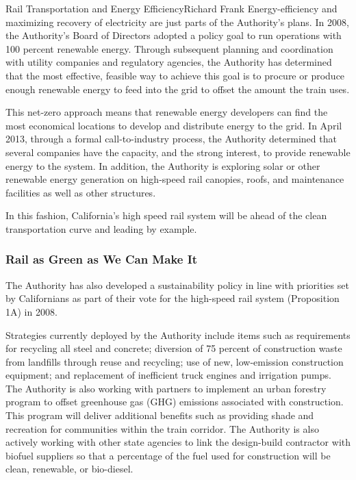 \documentclass{papertex}
\begin{document}
\begin{news}{2}{Rail Transportation and Energy Efficiency}{Richard Frank}{}{}
Energy-efficiency and maximizing recovery of electricity are just parts of the 
Authority’s plans.  In 2008, the Authority’s Board of Directors adopted a 
policy goal to run operations with  100 percent renewable energy. Through 
subsequent planning and coordination with utility companies and regulatory 
agencies, the Authority has determined that the most effective, feasible way 
to achieve this goal is to procure or produce enough renewable energy to feed 
into the grid to offset the amount the train uses.

This net-zero approach means that renewable energy developers can find the 
most economical locations to develop and distribute energy to the grid.  In 
April 2013, through a formal call-to-industry process, the Authority determined 
that several companies have the capacity, and the strong interest, to provide 
renewable energy to the system.  In addition, the Authority is exploring solar 
or other renewable energy generation on high-speed rail canopies, roofs, and 
maintenance facilities as well as other structures.

In this fashion, California’s high speed rail system will be ahead of the 
clean transportation curve and leading by example.

\subsubsection*{Rail as Green as We Can Make It}

The Authority has also developed a sustainability policy in line with 
priorities set by Californians as part of their vote for the high-speed rail 
system (Proposition 1A) in 2008.

Strategies currently deployed by the Authority include items such as 
requirements  for recycling all steel and concrete; diversion of 75 percent 
of construction waste from landfills through reuse and recycling; use of new, 
low-emission construction equipment; and replacement of inefficient truck 
engines and irrigation pumps.  The Authority is also working with partners to 
implement an urban forestry program to offset greenhouse gas (GHG) emissions 
associated with construction.  This program will deliver additional benefits 
such as providing shade and recreation for communities within the train 
corridor. The Authority is also actively working with other state agencies to 
link the design-build contractor with biofuel suppliers so that a percentage of 
the fuel used for construction will be clean, renewable, or bio-diesel. 


\end{news}
\end{document}
